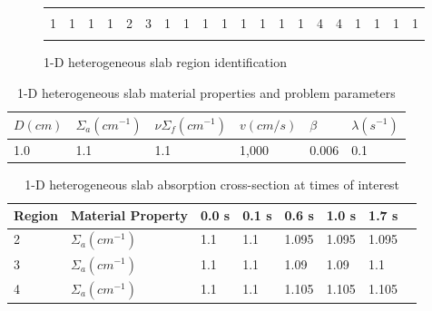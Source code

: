 \documentclass[12pt]{scrartcl}
\begin{document}
\begin{figure}[!htbp]
\begin{center}
\begin{tabular}{| l | l | l | l | l | l | l | l | l | l | l | l | l | l | l | l | l | l | l | l |}
\hline \hline \hline
  &   &   &   &   &   &    &    &   &   &   &   &   &   &   &   &   &   &   &   \\
1 & 1 & 1 & 1 & 2 & 3 & 1 & 1 & 1 & 1 & 1 & 1 & 1 & 1 & 4 & 4 & 1 & 1 & 1 & 1 \\
  &   &   &   &   &   &    &    &   &   &   &   &   &   &   &   &   &   &   &   \\
\hline \hline \hline
\end{tabular}
\caption{1-D heterogeneous slab region identification}
\label{fig:slab}
\end{center}
\end{figure}

\begin{table}[!htbp]
\begin{center}
\caption{1-D heterogeneous slab material properties and problem parameters}
\label{tab:1Dmat}
\begin{tabular}{llllll}
\hline
$D (cm)$ & $\Sigma_a (cm^{-1})$ & $\nu \Sigma_f (cm^{-1})$ & $v (cm/s)$ & $\beta$ & $\lambda (s^{-1})$ \\
\hline
1.0 & 1.1 & 1.1 & 1,000 & 0.006 & 0.1 \\

\hline
\end{tabular}
\end{center}
\end{table}

\begin{table}[!htbp]
\begin{center}
\caption{1-D heterogeneous slab absorption cross-section at times of interest}
\label{tab:1Dslope}
\begin{tabular}{llllllll}
\hline
Region & Material Property & 0.0 s & 0.1 s & 0.6 s & 1.0 s & 1.7 s \\
\hline
2 & $\Sigma_{a} (cm^{-1})$ & 1.1 & 1.1 & 1.095 & 1.095 & 1.095 \\
3 & $\Sigma_{a} (cm^{-1})$ & 1.1 & 1.1 & 1.09 & 1.09 & 1.1 \\
4 & $\Sigma_{a} (cm^{-1})$ & 1.1 & 1.1 & 1.105 & 1.105 & 1.105 \\
\hline
\end{tabular}
\end{center}
\end{table}
\end{document}
